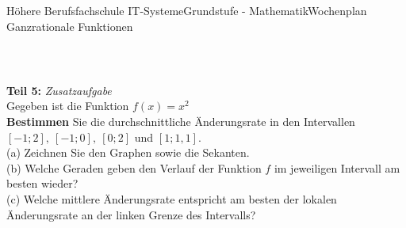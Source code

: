 \documentclass[oneside,openany,headings=optiontotoc,11pt,numbers=noenddot]{scrreprt}
\begin{document}
\begin{worksheet}{Höhere Berufsfachschule IT-Systeme}{Grundstufe - Mathematik}{Wochenplan Ganzrationale Funktionen}
\begin{framed}
\begin{tabularx}{\textwidth}{M|M}
			\end{tabularx}\\
		\end{framed}
		\begin{framed}
			\noindent
			\textbf{Teil 5:} \textit{Zusatzaufgabe}\\
			Gegeben ist die Funktion \(f(x) = x^2\)\\
			\textbf{Bestimmen} Sie die durchschnittliche Änderungsrate in den Intervallen \([-1;2],\ [-1;0],\ [0;2]\) und \([1;1,1]\).\\
			(a) Zeichnen Sie den Graphen sowie die Sekanten.\\
			(b) Welche Geraden geben den Verlauf der Funktion \(f\) im jeweiligen Intervall am besten wieder?\\
			(c) Welche mittlere Änderungsrate entspricht am besten der lokalen Änderungsrate an der linken Grenze des Intervalls?
		\end{framed}
	\end{worksheet}
\end{document}
